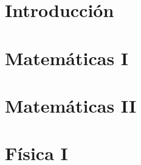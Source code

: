 \documentclass[12pt,fleqn]{book} %
\begin{document}

\pagestyle{empty} %

\tableofcontents %


\pagestyle{fancy} %




\chapter{Introducción}


\twocolumn

\newpage


\chapter{Matemáticas I}\label{chap:math1}

\newpage


\chapter{Matemáticas II}\label{chap:math2}




\chapter{F\'{i}sica I}\label{chap:phy1}


\end{document}
